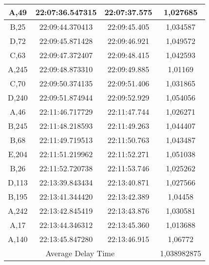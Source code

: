 \begin{table}[]
\begin{tabular}{|ccc|c|}
  \multicolumn{1}{|c|}{A,49}  & \multicolumn{1}{c|}{22:07:36.547315} & 22:07:37.575       & 1,027685    \\ \hline
  \multicolumn{1}{|c|}{B,25}  & \multicolumn{1}{c|}{22:09:44.370413} & 22:09:45.405       & 1,034587    \\ \hline
  \multicolumn{1}{|c|}{D,72}  & \multicolumn{1}{c|}{22:09:45.871428} & 22:09:46.921       & 1,049572    \\ \hline
  \multicolumn{1}{|c|}{C,63}  & \multicolumn{1}{c|}{22:09:47.372407} & 22:09:48.415       & 1,042593    \\ \hline
  \multicolumn{1}{|c|}{A,245} & \multicolumn{1}{c|}{22:09:48.873310} & 22:09:49.885       & 1,01169     \\ \hline
  \multicolumn{1}{|c|}{C,70}  & \multicolumn{1}{c|}{22:09:50.374135} & 22:09:51.406       & 1,031865    \\ \hline
  \multicolumn{1}{|c|}{D,240} & \multicolumn{1}{c|}{22:09:51.874944} & 22:09:52.929       & 1,054056    \\ \hline
  \multicolumn{1}{|c|}{A,46}  & \multicolumn{1}{c|}{22:11:46.717729} & 22:11:47.744       & 1,026271    \\ \hline
  \multicolumn{1}{|c|}{B,245} & \multicolumn{1}{c|}{22:11:48.218593} & 22:11:49.263       & 1,044407    \\ \hline
  \multicolumn{1}{|c|}{B,68}  & \multicolumn{1}{c|}{22:11:49.719513} & 22:11:50.763       & 1,043487    \\ \hline
  \multicolumn{1}{|c|}{E,204} & \multicolumn{1}{c|}{22:11:51.219962} & 22:11:52.271       & 1,051038    \\ \hline
  \multicolumn{1}{|c|}{B,26}  & \multicolumn{1}{c|}{22:11:52.720738} & 22:11:53.746       & 1,025262    \\ \hline
  \multicolumn{1}{|c|}{D,113} & \multicolumn{1}{c|}{22:13:39.843434} & 22:13:40.871       & 1,027566    \\ \hline
  \multicolumn{1}{|c|}{B,195} & \multicolumn{1}{c|}{22:13:41.344420} & 22:13:42.389       & 1,04458     \\ \hline
  \multicolumn{1}{|c|}{A,242} & \multicolumn{1}{c|}{22:13:42.845419} & 22:13:43.876       & 1,030581    \\ \hline
  \multicolumn{1}{|c|}{A,17}  & \multicolumn{1}{c|}{22:13:44.346312} & 22:13:45.360       & 1,013688    \\ \hline
  \multicolumn{1}{|c|}{A,140} & \multicolumn{1}{c|}{22:13:45.847280} & 22:13:46.915       & 1,06772     \\ \hline
  \multicolumn{3}{|c|}{Average Delay Time}                                                & 1,038982875 \\ \hline
  \end{tabular}
\end{table}

